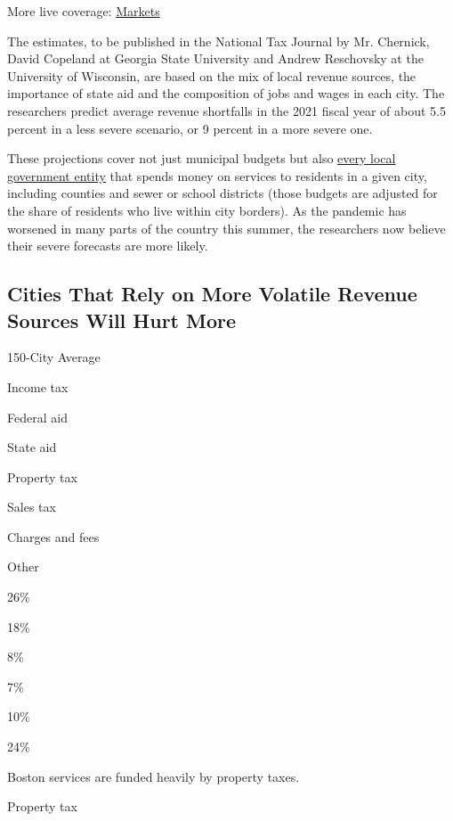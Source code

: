 More live coverage:
\href{https://www.nytimes3xbfgragh.onion/live/2020/08/20/business/stock-market-today-coronavirus?action=click\&pgtype=Article\&state=default\&region=MAIN_CONTENT_1\&context=storylines_live_updates}{Markets}

The estimates, to be published in the National Tax Journal by Mr.
Chernick, David Copeland at Georgia State University and Andrew
Reschovsky at the University of Wisconsin, are based on the mix of local
revenue sources, the importance of state aid and the composition of jobs
and wages in each city. The researchers predict average revenue
shortfalls in the 2021 fiscal year of about 5.5 percent in a less severe
scenario, or 9 percent in a more severe one.

These projections cover not just municipal budgets but also
\href{https://www.lincolninst.edu/research-data/data-toolkits/fiscally-standardized-cities}{every
local government entity} that spends money on services to residents in a
given city, including counties and sewer or school districts (those
budgets are adjusted for the share of residents who live within city
borders). As the pandemic has worsened in many parts of the country this
summer, the researchers now believe their severe forecasts are more
likely.

\hypertarget{cities-that-rely-on-more-volatile-revenue-sources-will-hurt-more}{%
\subsection{Cities That Rely on More Volatile Revenue Sources Will Hurt
More}\label{cities-that-rely-on-more-volatile-revenue-sources-will-hurt-more}}

150-City Average

Income tax

Federal aid

State aid

Property tax

Sales tax

Charges and fees

Other

26\%

18\%

8\%

7\%

10\%

24\%

Boston services are funded heavily by property taxes.

Property tax

